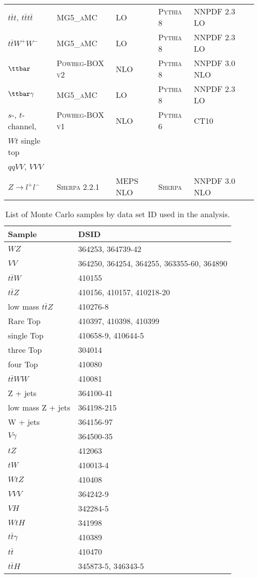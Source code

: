 \begin{table}[H]
\begin{center}
{\begin{tabular}{llllll}
$t\bar t t$, $t\bar t t\bar t$ & \textsc{MG5\_aMC} & LO & \textsc{Pythia} 8 & NNPDF 2.3 LO  \\
$t\bar t W^+ W^-$ & \textsc{MG5\_aMC} & LO & \textsc{Pythia} 8 & NNPDF 2.3 LO\\
$\ttbar$ & \textsc{Powheg-BOX v2} \cite{powhegtt} & NLO & \textsc{Pythia} 8 & NNPDF 3.0 NLO  \\
$\ttbar\gamma$ & \textsc{MG5\_aMC} & LO & \textsc{Pythia} 8 & NNPDF 2.3 LO \\
$s$-, $t$-channel, & \textsc{Powheg-BOX v1} \cite{powhegstp}& NLO & \textsc{Pythia} 6 & CT10 \\
 $Wt$ single top & & & &  \\
$qqVV$, $VVV$ & &   \\
$Z \to l^+l^-$ & \textsc{Sherpa} 2.2.1 & MEPS NLO  & \textsc{Sherpa} & NNPDF 3.0 NLO \\
\hline\hline
\end{tabular}
}
\end{center}
\end{table}

\begin{table}[H]
    \centering
    \begin{tabular}{l|l}
        \hline\hline
        Sample & DSID \\
        \hline\hline
        $WZ$ & 364253, 364739-42 \\
        $VV$ & 364250, 364254, 364255, 363355-60, 364890 \\
        $t\bar{t}W$ & 410155 \\
        $t\bar{t}Z$ & 410156, 410157, 410218-20 \\
        low mass $t\bar{t}Z$ & 410276-8 \\
        Rare Top & 410397, 410398, 410399 \\
        single Top & 410658-9, 410644-5 \\
        three Top & 304014 \\
        four Top & 410080 \\
        $t\bar{t}WW$ & 410081 \\
        Z + jets & 364100-41 \\
        low mass Z + jets & 364198-215 \\
        W + jets & 364156-97 \\
        $V\gamma$ & 364500-35 \\
        $tZ$  & 412063 \\
        $tW$  & 410013-4 \\
        $WtZ$ & 410408 \\
        $VVV$ & 364242-9 \\
        $VH$ & 342284-5 \\
        $WtH$ & 341998 \\
        $t\bar{t}\gamma$ & 410389 \\
        $t\bar{t}$ & 410470 \\
        $t\bar{t}H$ & 345873-5, 346343-5 \\
        \hline\hline
    \end{tabular}
    \caption{List of Monte Carlo samples by data set ID used in the analysis.}
    \label{tbl:dsids}
\end{table}
